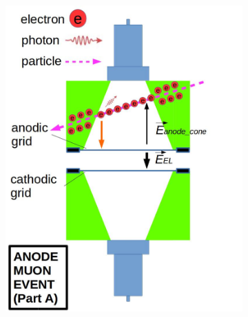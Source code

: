 \begin{figure}[!htbp]
	\centering
	\begin{subfigure}[b]{0.8\textwidth}
		\centering
		\includegraphics[width=\halfwidth,clip,trim={0 0 0 0},angle=0,origin=c]{Figures/GasTest/WeiDrawEvent/AnodeMuonEventA.jpg}

\end{subfigure}
\end{figure}
